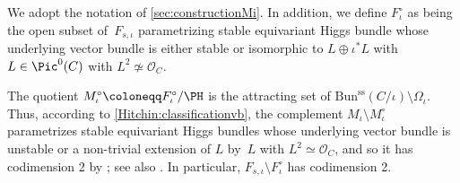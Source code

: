 We adopt the notation of \cref{sec:constructionMi}. In addition, we define $F^{\circ}_{\iota}$ as being the open subset of~$F_{s, \iota}$ parametrizing stable equivariant Higgs bundle whose underlying vector bundle is either stable or isomorphic to $L \oplus \iota^*L$ with $L \in \Pic^0(C)$ with $L^2 \not\simeq \mathcal{O}_C$.

The quotient $M^{\circ}_{\iota} \coloneqq F^{\circ}_{\iota}/\PH$ is the attracting set of $\mathrm{Bun}^\mathrm{ss}(C/\iota) \setminus \Omega_{\iota}$. Thus, accord\-ing to \cref{Hitchin:classificationvb},
the complement $M_{\iota} \setminus M^\circ_{\iota}$ parametrizes stable equivariant Higgs bundles whose underlying vector bundle is unstable or a non-trivial extension of $L$ by~$L$ with $L^2 \simeq \mathcal{O}_C$, and so it has codimension 2 by \cite[Ex.\,3.13(iv)\,\&\,(v)]{Hitchin1987}; see also \cite[Lem.\,3.4]{KiemYoo08}. In particular, $F_{s, \iota} \setminus F^{\circ}_{\iota}$ has codimension 2.

